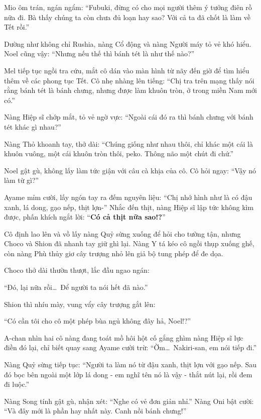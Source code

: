 \documentclass[../main.tex]{subfiles}
\begin{document}
Mio ôm trán, ngán ngẩm: ``Fubuki, đừng có cho mọi người thêm ý tưởng điên rồ nữa đi. Bà thấy chúng ta còn chưa đủ loạn hay sao? Với cả ta đã chốt là làm về Tết rồi.''

Dường như không chỉ Rushia, nàng Cổ động và nàng Người máy tỏ vẻ khó hiểu. Noel cũng vậy: ``Nhưng nếu thế thì bánh tét là như thế nào?''

Mel tiếp tục ngồi tra cứu, mắt cô dán vào màn hình từ nãy đến giờ để tìm hiểu thêm về các phong tục Tết. Cô nhẹ nhàng lên tiếng: ``Chị tra trên mạng thấy nói rằng bánh tét là bánh chưng, nhưng được làm khuôn tròn, ở trong miền Nam mới có.''

Nàng Hiệp sĩ chớp mắt, tỏ vẻ ngờ vực: ``Ngoài cái đó ra thì bánh chưng với bánh tét khác gì nhau?''

Nàng Thỏ khoanh tay, thở dài: ``Chúng giống như nhau thôi, chỉ khác một cái là khuôn vuông, một cái khuôn tròn thôi, peko. Thông não một chút đi chứ.''

Noel gật gù, không lấy làm tức giận với câu cà khịa của cô. Cô hỏi ngay: ``Vậy nó làm từ gì?''

Ayame mỉm cười, lấy ngón tay ra đếm nguyên liệu: ``Chị nhớ hình như là có đậu xanh, lá dong, gạo nếp, thịt lợn-'' Nhắc đến thịt, nàng Hiệp sĩ lập tức không kìm được, phấn khích ngắt lời: ``\textbf{Có cả thịt nữa sao!?}''

Cô định lao lên và vồ lấy nàng Quỷ sừng xuống để hỏi cho tường tận, nhưng Choco và Shion đã nhanh tay giữ ghì lại. Nàng Y tá kéo cô ngồi thụp xuống ghế, còn nàng Phù thủy giơ cây trượng nhỏ lên giả bộ tung phép để đe dọa.

Choco thở dài thườn thượt, lắc đầu ngao ngán:

``Đó, lại nữa rồi\dots\ Để người ta nói hết đã nào.''

Shion thì nhíu mày, vung vẩy cây trượng gắt lên:

``Có cần tôi cho cô một phép bùa ngủ không đây hả, Noel!?''

A-chan nhìn hai cô nàng đang toát mồ hôi hột cố gắng ghìm nàng Hiệp sĩ lực điền đó lại, chỉ biết quay sang Ayame cười trừ: ``Ờm\dots\ Nakiri-san, em nói tiếp đi.''

Nàng Quỷ sừng tiếp tục: ``Người ta làm nó từ đậu xanh, thịt lợn với gạo nếp. Sau đó bọc bên ngoài một lớp lá dong - em nghĩ tên nó là vậy - thắt nút lại, rồi đem đi luộc.''

Nàng Song tính gật gù, nhận xét: ``Nghe có vẻ đơn giản nhỉ.'' Nàng Oni bật cười: ``Và đây mới là phần hay nhất này. Canh nồi bánh chưng!''
\end{document}
